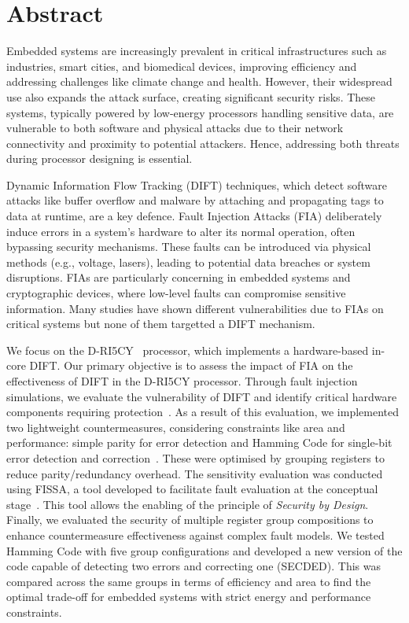 \chapter*{Abstract}
\label{chapter:abstract}
\minitoc

Embedded systems are increasingly prevalent in critical infrastructures such as industries, smart cities, and biomedical devices, improving efficiency and addressing challenges like climate change and health. However, their widespread use also expands the attack surface, creating significant security risks. These systems, typically powered by low-energy processors handling sensitive data, are vulnerable to both software and physical attacks due to their network connectivity and proximity to potential attackers. Hence, addressing both threats during processor designing is essential.

Dynamic Information Flow Tracking (DIFT) techniques, which detect software attacks like buffer overflow and malware by attaching and propagating tags to data at runtime, are a key defence.
Fault Injection Attacks (FIA) deliberately induce errors in a system's hardware to alter its normal operation, often bypassing security mechanisms. These faults can be introduced via physical methods (e.g., voltage, lasers), leading to potential data breaches or system disruptions. FIAs are particularly concerning in embedded systems and cryptographic devices, where low-level faults can compromise sensitive information. Many studies have shown different vulnerabilities due to FIAs on critical systems but none of them targetted a DIFT mechanism.

We focus on the D-RI5CY~\cite{PDGLC-18-hpec} processor, which implements a hardware-based in-core DIFT. Our primary objective is to assess the impact of FIA on the effectiveness of DIFT in the D-RI5CY processor. Through fault injection simulations, we evaluate the vulnerability of DIFT and identify critical hardware components requiring protection~\cite{PLG-22-SensorsSP}. 
As a result of this evaluation, we implemented two lightweight countermeasures, considering constraints like area and performance: simple parity for error detection and Hamming Code for single-bit error detection and correction~\cite{PRLG-24-isvlsi}. These were optimised by grouping registers to reduce parity/redundancy overhead. The sensitivity evaluation was conducted using FISSA, a tool developed to facilitate fault evaluation at the conceptual stage~\cite{PLG-24-dsd}. This tool allows the enabling of the principle of \textit{Security by Design}.
Finally, we evaluated the security of multiple register group compositions to enhance countermeasure effectiveness against complex fault models. We tested Hamming Code with five group configurations and developed a new version of the code capable of detecting two errors and correcting one (SECDED). This was compared across the same groups in terms of efficiency and area to find the optimal trade-off for embedded systems with strict energy and performance constraints.